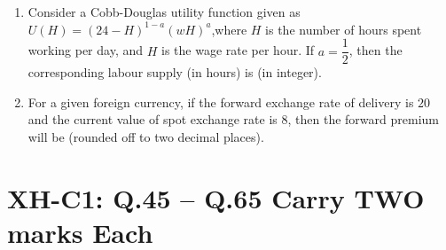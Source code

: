 \documentclass{article}
\begin{document}
\begin{enumerate}[leftmargin=*, start=27, label=Q.\arabic*.]
    \item Consider a Cobb-Douglas utility function given as $U(H)=(24-H)^{1-a}(wH)^a$,where $H$ is the number of hours spent working per day, and $H$ is the wage rate per hour. If $a=\dfrac{1}{2}$, then the corresponding labour supply (in hours) is \makebox[1cm]{\hrulefill} (in integer).

    \item For a given foreign currency, if the forward exchange rate of delivery is $20$ and the current value of spot exchange rate is $8$, then the forward premium will be \makebox[1cm]{\hrulefill} (rounded off to two decimal places).

\end{enumerate}

\section*{XH-C1: Q.45 – Q.65 Carry TWO marks Each}
\end{document}
